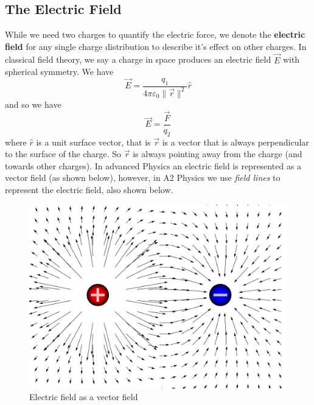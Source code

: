 \subsection{The Electric Field}

While we need two charges to quantify the electric force, we denote the \textbf{electric field} for any single charge distribution to describe it's effect on other charges. In classical field theory, we say a charge in space produces an electric field $\vec{E}$ with spherical symmetry. We have 
\begin{equation}
    \vec{E} = \frac{q_1}{4 \pi \varepsilon_0 \| \vec{r} \|^2} \hat{r}
\end{equation}
and so we have
\begin{equation}
    \vec{E} = \frac{\vec{F}}{q_2}
\end{equation}
where $\hat{r}$ is a unit surface vector, that is $\vec{r}$ is a vector that is always perpendicular to the surface of the charge. So $\vec{r}$ is always pointing away from the charge (and towards other charges). In advanced Physics an electric field is represented as a vector field (as shown below), however, in A2 Physics we use \textit{field lines} to represent the electric field, also shown below. 
\begin{figure}[h!]
    \centering
    \includegraphics[scale=0.25]{notes/images/Electric-Field-Vector.JPG}
    \caption{Electric field as a vector field}
\end{figure}
\FloatBarrier

